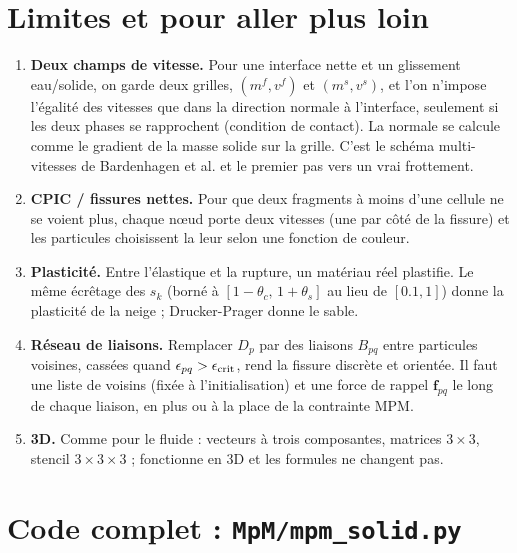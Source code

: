 \documentclass[11pt,a4paper]{article}
\newcommand{\code}[1]{\texttt{\detokenize{#1}}}
\begin{document}
\section{Limites et pour aller plus loin}

\begin{enumerate}
  \item \textbf{Deux champs de vitesse.} Pour une interface nette et un glissement eau/solide, on
        garde deux grilles, $(m^f, v^f)$ et $(m^s, v^s)$, et l'on n'impose l'égalité des vitesses
        que dans la direction normale à l'interface, seulement si les deux phases se rapprochent
        (condition de contact). La normale se calcule comme le gradient de la masse solide sur la
        grille. C'est le schéma \og multi-vitesses \fg{} de Bardenhagen et al. et le premier pas vers
        un vrai frottement.
  \item \textbf{CPIC / fissures nettes.} Pour que deux fragments à moins d'une cellule ne se
        \og voient \fg{} plus, chaque n\oe ud porte deux vitesses (une par côté de la fissure) et les
        particules choisissent la leur selon une fonction de couleur.
  \item \textbf{Plasticité.} Entre l'élastique et la rupture, un matériau réel plastifie. Le même
        écrêtage des $s_k$ (borné à $[1-\theta_c,\,1+\theta_s]$ au lieu de $[0.1, 1]$) donne la
        plasticité de la neige ; Drucker-Prager donne le sable.
  \item \textbf{Réseau de liaisons.} Remplacer $D_p$ par des liaisons $B_{pq}$ entre particules
        voisines, cassées quand $\epsilon_{pq} > \epsilon_{\rm crit}$, rend la fissure discrète et
        orientée. Il faut une liste de voisins (fixée à l'initialisation) et une force de rappel
        $\mathbf f_{pq}$ le long de chaque liaison, en plus ou à la place de la contrainte MPM.
  \item \textbf{3D.} Comme pour le fluide : vecteurs à trois composantes, matrices $3\times3$,
        stencil $3\times3\times3$ ; \code{ti.svd} fonctionne en 3D et les formules ne changent pas.
\end{enumerate}

\appendix
\section{Code complet : \texttt{MpM/mpm\_solid.py}}
\label{app:solid}
\end{document}
